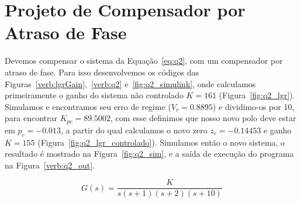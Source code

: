 \documentclass[a4paper]{article}
\begin{document}
\section{Projeto de Compensador por Atraso de Fase}\label{sec:cont_fase}
Devemos compensar o sistema da Equação~\ref{eq:q2}, com um
compensador por atraso de fase. Para isso desenvolvemos
os códigos das Figuras~\ref{verb:lgrGain},~\ref{verb:q2} e~\ref{fig:q2_simulink}, onde calculamos
primeiramente o ganho do sistema não controlado $K=161$ (Figura~\ref{fig:q2_lgr}).
Simulamos e encontramos seu erro de regime ($V_r=0.8895$)
e dividimo-os por 10, para encontrar $K_{pc}=89.5002$, com esse
definimos que nosso novo polo deve estar em $p_c=-0.013$,
a partir do qual calculamos o novo zero $z_c=-0.14453$ e ganho
$K=155$ (Figura~\ref{fig:q2_lgr_controlado}).
Simulamos então o novo sistema, o resultado é mostrado na Figura~\ref{fig:q2_sim},
e a saída de execução do programa na Figura~\ref{verb:q2_out}.

\begin{equation}
G(s)=\frac{K}{s(s+1)(s+2)(s+10)}
\label{eq:q2}
\end{equation}
\end{document}
